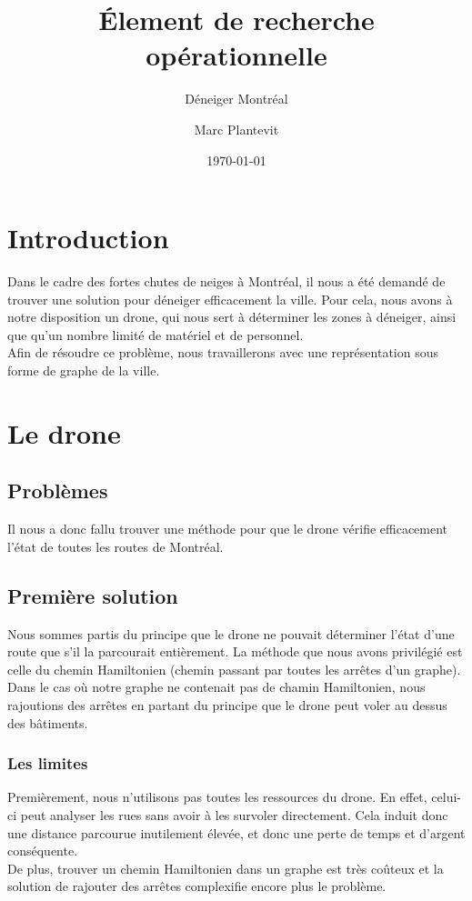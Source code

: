 \documentclass[12pt, twoside]{report}
\title{Élement de recherche opérationnelle}
\subtitle{Déneiger Montréal}
\author{Marc Plantevit}
\date{\today}
\begin{document}


\tableofcontents


\pagestyle{plain}

\chapter{Introduction}\label{chp:intro}

Dans le cadre des fortes chutes de neiges à Montréal, il nous a été demandé de
trouver une solution pour déneiger efficacement la ville. Pour cela, nous avons
à notre disposition un drone, qui nous sert à déterminer les zones à déneiger, 
ainsi que qu'un nombre limité de matériel et de personnel.\\
Afin de résoudre ce problème, nous travaillerons avec une représentation sous
forme de graphe de la ville.

\chapter{Le drone}\label{chp:drone}
\section{Problèmes}
Il nous a donc fallu trouver une méthode pour que le drone vérifie efficacement
l'état de toutes les routes de Montréal.
\section{Première solution}


Nous sommes partis du principe que le drone ne pouvait déterminer l'état d'une
route que s'il la parcourait entièrement. La méthode que nous avons privilégié
est celle du chemin Hamiltonien (chemin passant par toutes les arrêtes d'un
graphe). Dans le cas où notre graphe ne contenait pas de chamin Hamiltonien, 
nous rajoutions des arrêtes en partant du principe que le drone peut voler au
dessus des bâtiments.
\subsection{Les limites}


Premièrement, nous n'utilisons pas toutes les ressources du drone. En effet,
celui-ci peut analyser les rues sans avoir à les survoler directement. Cela
induit donc une distance parcourue inutilement élevée, et donc une perte de
temps et d'argent conséquente.\\
De plus, trouver un chemin Hamiltonien dans un graphe est très coûteux et
la solution de rajouter des arrêtes complexifie encore plus le problème.
\end{document}
